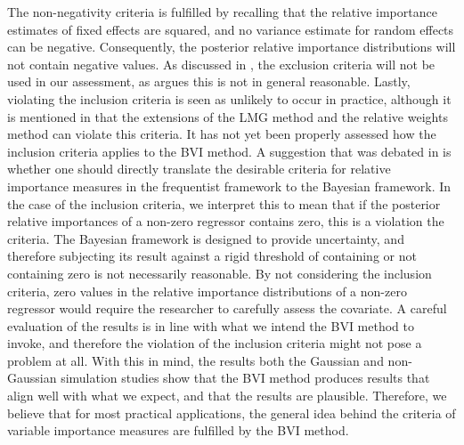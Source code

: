 The non-negativity criteria is fulfilled by recalling that the relative importance estimates of fixed effects are squared, and no variance estimate for random effects can be negative. Consequently, the posterior relative importance distributions will not contain negative values. As discussed in \citet{Arnstad:Relative_variable_importance_in_Bayesian_linear_mixed_models:2024}, the exclusion criteria will not be used in our assessment, as \citet{gromping_relaimpo} argues this is not in general reasonable. Lastly, violating  the inclusion criteria is seen as unlikely to occur in practice, although it is mentioned in \citet{matre} that the extensions of the LMG method and the relative weights method can violate this criteria. It has not yet been properly assessed how the inclusion criteria applies to the BVI method. A suggestion that was debated in \citep{Arnstad:Relative_variable_importance_in_Bayesian_linear_mixed_models:2024} is whether one should directly translate the desirable criteria for relative importance measures in the frequentist framework to the Bayesian framework. In the case of the inclusion criteria, we interpret this to mean that if the posterior relative importances of a non-zero regressor contains zero, this is a violation the criteria. The Bayesian framework is designed to provide uncertainty, and therefore subjecting its result against a rigid threshold of containing or not containing zero is not necessarily reasonable. By not considering the inclusion criteria, zero values in the relative importance distributions of a non-zero regressor would require the researcher to carefully assess the covariate. A careful evaluation of the results is in line with what we intend the BVI method to invoke, and therefore the violation of the inclusion criteria might not pose a problem at all. With this in mind, the results both the Gaussian and non-Gaussian simulation studies show that the BVI method produces results that align well with what we expect, and that the results are plausible. Therefore, we believe that for most practical applications, the general idea behind the criteria of variable importance measures are fulfilled by the BVI method. 
\\
\\
